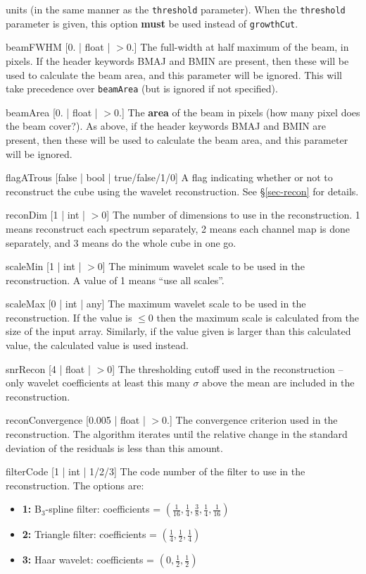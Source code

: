 \begin{Lentry}
  units (in the same manner as the \texttt{threshold} parameter). When
  the \texttt{threshold} parameter is given, this option \textbf{must}
  be used instead of \texttt{growthCut}.
\item[{beamFWHM [0. | float | $> 0.$]}] The full-width at half maximum
  of the beam, in pixels.  If the header keywords BMAJ and BMIN are
  present, then these will be used to calculate the beam area, and
  this parameter will be ignored. This will take precedence over
  \texttt{beamArea} (but is ignored if not specified).
\item[{beamArea [0. | float | $> 0.$]}] The \textbf{area} of the beam
  in pixels (\ie how many pixel does the beam cover?). As above, if
  the header keywords BMAJ and BMIN are present, then these will be
  used to calculate the beam area, and this parameter will be ignored.
\end{Lentry}

\begin{Lentry}
\item[{flagATrous [false | bool | true/false/1/0]}] A flag indicating
  whether or not to reconstruct the cube using the \atrous wavelet
  reconstruction. See \S\ref{sec-recon} for details.
\item[{reconDim [1 | int | $> 0$]}] The number of dimensions to use in
  the reconstruction. 1 means reconstruct each spectrum separately, 2
  means each channel map is done separately, and 3 means do the whole
  cube in one go.
\item[{scaleMin [1 | int | $> 0$]}] The minimum wavelet scale to be
  used in the reconstruction. A value of 1 means ``use all scales''.
\item[{scaleMax [0 | int | any]}] The maximum wavelet scale to be used
  in the reconstruction. If the value is $\le0$ then the maximum scale
  is calculated from the size of the input array. Similarly, if the
  value given is larger than this calculated value, the calculated
  value is used instead.
\item[{snrRecon [4 | float | $> 0$]}] The thresholding cutoff used in
  the reconstruction -- only wavelet coefficients at least this many
  $\sigma$ above the mean are included in the reconstruction.
\item[{reconConvergence [0.005 | float | $> 0.$]}] The convergence
  criterion used in the reconstruction. The \atrous algorithm iterates
  until the relative change in the standard deviation of the residuals
  is less than this amount.
\item[{filterCode [1 | int | 1/2/3]}] The code number of the filter to
  use in the reconstruction. The options are:
  \begin{itemize}
  \item \textbf{1:} B$_3$-spline filter: coefficients = 
    $(\frac{1}{16}, \frac{1}{4}, \frac{3}{8}, \frac{1}{4}, \frac{1}{16})$
  \item \textbf{2:} Triangle filter: coefficients = 
    $(\frac{1}{4}, \frac{1}{2}, \frac{1}{4})$
  \item \textbf{3:} Haar wavelet: coefficients = 
    $(0, \frac{1}{2}, \frac{1}{2})$
  \end{itemize}
\end{Lentry}

